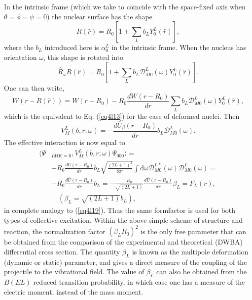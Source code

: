 \begin{subappendices}
In the intrinsic frame (which we take to coincide with the space-fixed axis when $\theta=\phi=\psi=0$) the nuclear surface has the shape
\begin{equation}\label{eq4l23}
R(\hat r)= R_0 \left[ 1+ \sum_L b_L  Y^L_0(\hat r)\right],
\end{equation}
where the $b_L$ introduced here is $\alpha_0^L$ in the intrinsic frame. When the nucleus has orientation $\omega$, this shape is rotated into
\begin{equation}\label{eq4l24}
\hat{R}_\omega R(\hat r)= R_0 \left[ 1+ \sum_L b_L \mathcal D_{M0}^L(\omega) Y^L_0(\hat r)\right].
\end{equation}
One can then write,
\begin{equation}\label{eq4l25}
W(r-R(\hat r))=W(r-R_0)-R_0\frac{d  W(r-R_0)}{d r}
\sum_L b_L \mathcal D_{M0}^L(\omega) Y^L_0(\hat r),
\end{equation}
which is the equivalent to Eq. (\ref{eq4l13}) for the case of deformed nuclei. Then
\begin{equation}
 V_M^L(b,r;\omega)=-\frac{d
\bar U_\beta (r-R_0)}{d r}b_L \mathcal D_{M0}^L(\omega).
\end{equation}
The effective interaction is now equal to
\begin{equation}
\begin{split}
 \langle  \Psi&_{I M K=0} , V_M^L(b,r;\omega) \Psi_{000}\rangle =\\
& -R_0\frac{d
\bar U (r-R_0)}{d r}b_L \sqrt{\frac{(2L+1)^2}{8\pi^2}} \int \mathrm{d} \omega \mathcal D_{M0}^{L*}(\omega)
\mathcal D_{M0}^L(\omega)=\\
& -R_0\frac{d
\bar U (r-R_0)}{d r}b_L=-\frac{R_0}{\sqrt{(2L+1)}}\frac{d
\bar U (r-R_0)}{d r}\beta_L=F_L(r),\\
& \quad (\beta_L=\sqrt{(2L+1)} b_L),
\end{split}
\end{equation}
in complete analogy to (\ref{eq4l19}). Thus the same formfactor is used for both types of collective excitation. Within the above simple scheme of structure and reaction, 
the normalization factor $(\beta_L R_0)^2$  is the only free parameter that can be obtained from the comparison of the experimental and theoretical (DWBA) differential cross section. The quantity $\beta_L$ is known as the multipole deformation (dynamic or static) parameter, and gives a direct measure of the coupling of the projectile to the vibrational field.
The value of $\beta_L$ can also be obtained from the $B(EL)$ reduced transition probability, in which case one has a measure of the electric moment, instead of the mass moment.

\end{subappendices}
